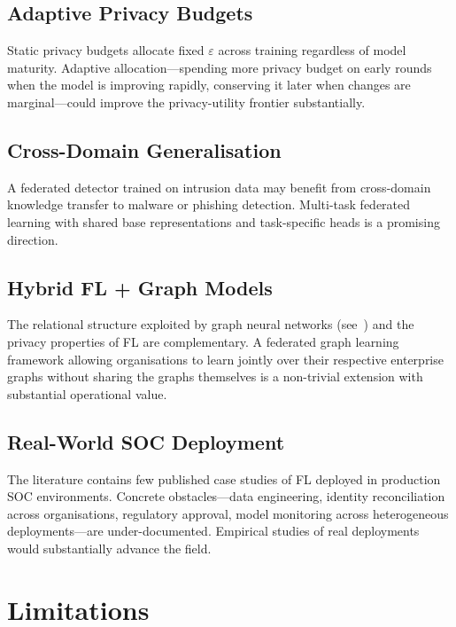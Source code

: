 \documentclass[sigconf,nonacm]{acmart}
\begin{document}
\subsection{Adaptive Privacy Budgets}

Static privacy budgets allocate fixed $\varepsilon$ across training
regardless of model maturity. Adaptive allocation---spending more privacy
budget on early rounds when the model is improving rapidly, conserving it
later when changes are marginal---could improve the privacy-utility
frontier substantially.

\subsection{Cross-Domain Generalisation}

A federated detector trained on intrusion data may benefit from
cross-domain knowledge transfer to malware or phishing detection. Multi-task
federated learning with shared base representations and task-specific heads
is a promising direction.

\subsection{Hybrid FL + Graph Models}

The relational structure exploited by graph neural networks
(see~\cite{lo2022eGraphSAGE}) and the privacy properties of FL are
complementary. A federated graph learning framework allowing organisations
to learn jointly over their respective enterprise graphs without
sharing the graphs themselves is a non-trivial extension with substantial
operational value.

\subsection{Real-World SOC Deployment}

The literature contains few published case studies of FL deployed in
production SOC environments. Concrete obstacles---data engineering,
identity reconciliation across organisations, regulatory approval, model
monitoring across heterogeneous deployments---are under-documented.
Empirical studies of real deployments would substantially advance the
field.

\section{Limitations}
\end{document}
